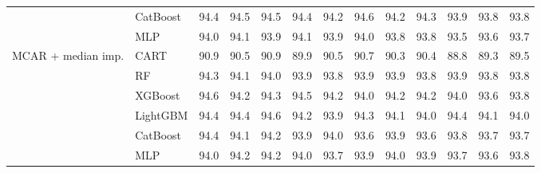 \begin{table}[p]
\begin{tabular}{@{}llrrrrrrrrrrr@{}}
 & CatBoost & 94.4 & 94.5 & 94.5 & 94.4 & 94.2 & 94.6 & 94.2 & 94.3 & 93.9 & 93.8 & 93.8 \\
 & MLP & 94.0 & 94.1 & 93.9 & 94.1 & 93.9 & 94.0 & 93.8 & 93.8 & 93.5 & 93.6 & 93.7 \\
\midrule
MCAR + median imp. & CART & 90.9 & 90.5 & 90.9 & 89.9 & 90.5 & 90.7 & 90.3 & 90.4 & 88.8 & 89.3 & 89.5 \\
 & RF & 94.3 & 94.1 & 94.0 & 93.9 & 93.8 & 93.9 & 93.9 & 93.8 & 93.9 & 93.8 & 93.8 \\
 & XGBoost & 94.6 & 94.2 & 94.3 & 94.5 & 94.2 & 94.0 & 94.2 & 94.2 & 94.0 & 93.6 & 93.8 \\
 & LightGBM & 94.4 & 94.4 & 94.6 & 94.2 & 93.9 & 94.3 & 94.1 & 94.0 & 94.4 & 94.1 & 94.0 \\
 & CatBoost & 94.4 & 94.1 & 94.2 & 93.9 & 94.0 & 93.6 & 93.9 & 93.6 & 93.8 & 93.7 & 93.7 \\
 & MLP & 94.0 & 94.2 & 94.2 & 94.0 & 93.7 & 93.9 & 94.0 & 93.9 & 93.7 & 93.6 & 93.8 \\
\bottomrule
\end{tabular}
\end{table}

